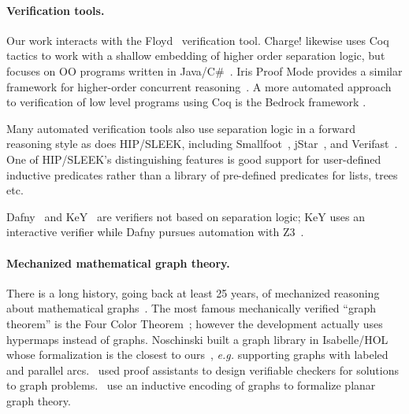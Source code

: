 \vspace{-1ex}
\paragraph{Verification tools.}
Our work interacts with the Floyd~\cite{appel:programlogics} verification
tool.  Charge! likewise uses Coq tactics to work with a shallow embedding of higher
order separation logic, but focuses on OO programs written in
Java/C\#~\cite{bengtson:charge}.  Iris Proof Mode provides a similar framework for higher-order
concurrent reasoning~\cite{krebbers:iris}.  A  more automated approach to verification of low
level programs using Coq is the Bedrock framework \cite{chlipala:bedrock}.

Many automated verification tools also use separation logic in a forward reasoning style
as does HIP/SLEEK, including Smallfoot~\cite{berdine:smallfoot},
jStar~\cite{distefanop08}, and Verifast~\cite{jacobs:verifast}.  One of HIP/SLEEK's
distinguishing features is good support for user-defined inductive predicates rather
than a library of pre-defined predicates for lists, trees etc.

Dafny~\cite{leino10} and KeY~\cite{beckert:2007} are verifiers not based
on separation logic; KeY uses an interactive verifier while Dafny pursues automation with Z3~\cite{moura2008}.


\vspace{-1ex}
\paragraph{Mechanized mathematical graph theory.} There is a long history,
going back at least 25 years, of mechanized reasoning about mathematical
graphs~\cite{wong1991}.  The most famous mechanically verified ``graph theorem''
is the Four Color Theorem~\cite{gonthier2005computer}; however
the development actually uses hypermaps instead of graphs.
Noschinski built a graph library in Isabelle/HOL whose formalization
is the closest to ours~\cite{noschinski2015}, \emph{e.g.} supporting
graphs with labeled and parallel arcs.
\cite{noschinski2015formalizing,dubois2015graphes}~used proof assistants to design verifiable
checkers for solutions to graph problems.
\cite{yamamoto1995formalization,bauer20025}~use an inductive
encoding of graphs to formalize planar graph theory.


